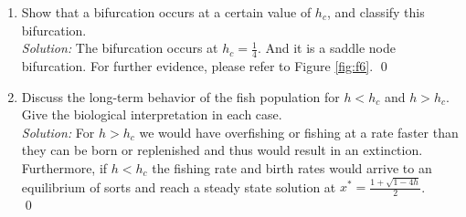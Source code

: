 \documentclass[10pt]{amsart}
\theoremstyle{nonumberplain}
\begin{document}
\begin{enumerate}[label={\bf {\arabic*}:}]
\begin{enumerate}
\qed \\

\item Show that a bifurcation occurs at a certain value of $h_c$, and classify this bifurcation. \\

\noindent
\textit{Solution:} The bifurcation occurs at $h_c = \frac 1 4$.
And it is a saddle node bifurcation.
For further evidence, please refer to Figure \ref{fig:f6}.
\qed \\

\item Discuss the long-term behavior of the fish population for $h < h_c$ and $h > h_c$. 
Give the biological interpretation in each case. \\

\noindent
\textit{Solution:} 
For $h > h_c$ we would have overfishing or fishing at a rate faster than they can be born or replenished and thus would result in an extinction.
Furthermore, if $h < h_c$ the fishing rate and birth rates would arrive to an equilibrium of sorts and reach a steady state solution at $x^* = \frac {1 + \sqrt{1 - 4h}}{2}$. \\
\qed \\

\end{enumerate}

\end{enumerate}
\end{document}
